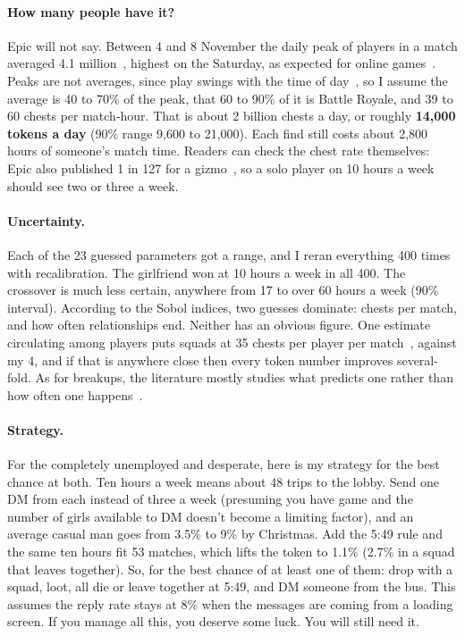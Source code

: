 \documentclass[11pt]{article}
\theoremstyle{definition}
\theoremstyle{plain}
\begin{document}
\paragraph{How many people have it?} Epic will not say. Between 4 and 8 November the daily peak of players in a match averaged 4.1 million~\cite{endgame}, highest on the Saturday, as expected for online games~\cite{vihanga}. Peaks are not averages, since play swings with the time of day~\cite{henderson}, so I assume the average is 40 to 70\% of the peak, that 60 to 90\% of it is Battle Royale, and 39 to 60 chests per match-hour. That is about 2 billion chests a day, or roughly \textbf{14{,}000 tokens a day} (90\% range 9{,}600 to 21{,}000). Each find still costs about 2{,}800 hours of someone's match time. Readers can check the chest rate themselves: Epic also published 1 in 127 for a gizmo~\cite{forbes}, so a solo player on 10 hours a week should see two or three a week.

\paragraph{Uncertainty.} Each of the 23 guessed parameters got a range, and I reran everything 400 times with recalibration. The girlfriend won at 10 hours a week in all 400. The crossover is much less certain, anywhere from 17 to over 60 hours a week (90\% interval). According to the Sobol indices, two guesses dominate: chests per match, and how often relationships end. Neither has an obvious figure. One estimate circulating among players puts squads at 35 chests per player per match~\cite{forbes}, against my 4, and if that is anywhere close then every token number improves several-fold. As for breakups, the literature mostly studies what predicts one rather than how often one happens~\cite{le2010}.

\paragraph{Strategy.} For the completely unemployed and desperate, here is my strategy for the best chance at both. Ten hours a week means about 48 trips to the lobby. Send one DM from each instead of three a week (presuming you have game and the number of girls available to DM doesn't become a limiting factor), and an average casual man goes from 3.5\% to 9\% by Christmas. Add the 5:49 rule and the same ten hours fit 53 matches, which lifts the token to 1.1\% (2.7\% in a squad that leaves together). So, for the best chance of at least one of them: drop with a squad, loot, all die or leave together at 5:49, and DM someone from the bus. This assumes the reply rate stays at 8\% when the messages are coming from a loading screen. If you manage all this, you deserve some luck. You will still need it.
\end{document}
